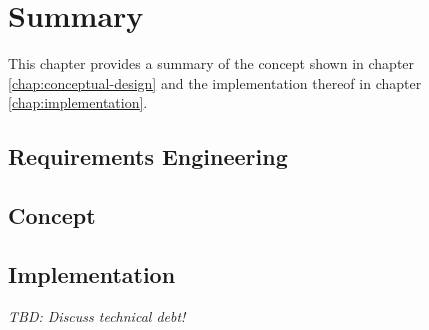 \chapter{Summary}
\label{chap:summary}
This chapter provides a summary of the concept shown in chapter \ref{chap:conceptual-design} and the implementation thereof in chapter \ref{chap:implementation}.

\section{Requirements Engineering}
\label{sec:summary-requirements-engineering}

\section{Concept}
\label{sec:summary-concept}

\section{Implementation}
\label{sec:summary-implementation}
\emph{TBD: Discuss technical debt!}